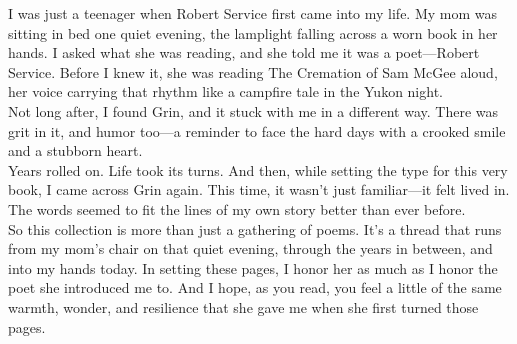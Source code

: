 \vspace{1em}
I was just a teenager when Robert Service first came into my life. My mom was sitting in bed one quiet evening, the lamplight falling across a worn book in her hands. I asked what she was reading, and she told me it was a poet—Robert Service. Before I knew it, she was reading The Cremation of Sam McGee aloud, her voice carrying that rhythm like a campfire tale in the Yukon night.\\

Not long after, I found Grin, and it stuck with me in a different way. There was grit in it, and humor too—a reminder to face the hard days with a crooked smile and a stubborn heart.\\

Years rolled on. Life took its turns. And then, while setting the type for this very book, I came across Grin again. This time, it wasn’t just familiar—it felt lived in. The words seemed to fit the lines of my own story better than ever before.\\

So this collection is more than just a gathering of poems. It’s a thread that runs from my mom’s chair on that quiet evening, through the years in between, and into my hands today. In setting these pages, I honor her as much as I honor the poet she introduced me to. And I hope, as you read, you feel a little of the same warmth, wonder, and resilience that she gave me when she first turned those pages.
